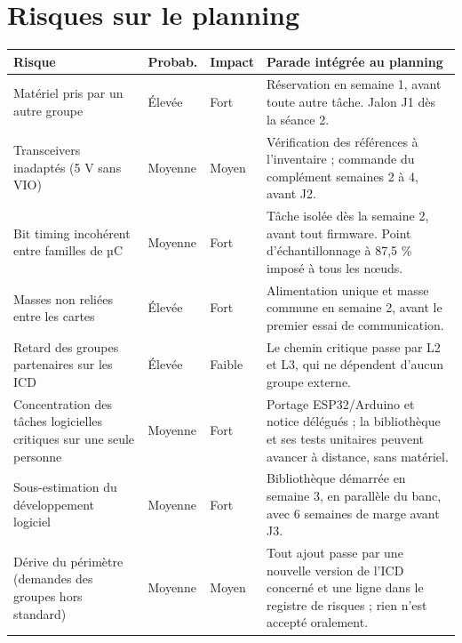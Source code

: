 \documentclass[10pt,a4paper,landscape]{article}
\begin{document}
\vspace{10pt}

\section*{Risques sur le planning}

\noindent
\begin{tabularx}{\textwidth}{L{5.4cm} C{1.5cm} C{1.5cm} X}
  \toprule
  \textbf{Risque} & \textbf{Probab.} & \textbf{Impact} & \textbf{Parade intégrée au planning} \\
  \midrule
  Matériel pris par un autre groupe & Élevée & Fort &
  Réservation en semaine 1, avant toute autre tâche. Jalon J1 dès la séance 2. \\
  Transceivers inadaptés (5 V sans VIO) & Moyenne & Moyen &
  Vérification des références à l'inventaire ; commande du complément semaines 2 à 4, avant J2. \\
  Bit timing incohérent entre familles de µC & Moyenne & Fort &
  Tâche isolée dès la semaine 2, avant tout firmware. Point d'échantillonnage à 87,5 \% imposé à tous les nœuds. \\
  Masses non reliées entre les cartes & Élevée & Fort &
  Alimentation unique et masse commune en semaine 2, avant le premier essai de communication. \\
  Retard des groupes partenaires sur les ICD & Élevée & Faible &
  Le chemin critique passe par L2 et L3, qui ne dépendent d'aucun groupe externe. \\
  Concentration des tâches logicielles critiques sur une seule personne & Moyenne & Fort &
  Portage ESP32/Arduino et notice délégués ; la bibliothèque et ses tests unitaires peuvent avancer à distance, sans matériel. \\
  Sous-estimation du développement logiciel & Moyenne & Fort &
  Bibliothèque démarrée en semaine 3, en parallèle du banc, avec 6 semaines de marge avant J3. \\
  Dérive du périmètre (demandes des groupes hors standard) & Moyenne & Moyen &
  Tout ajout passe par une nouvelle version de l'ICD concerné et une ligne dans le registre de risques ; rien n'est accepté oralement. \\
  \bottomrule
\end{tabularx}
\end{document}
